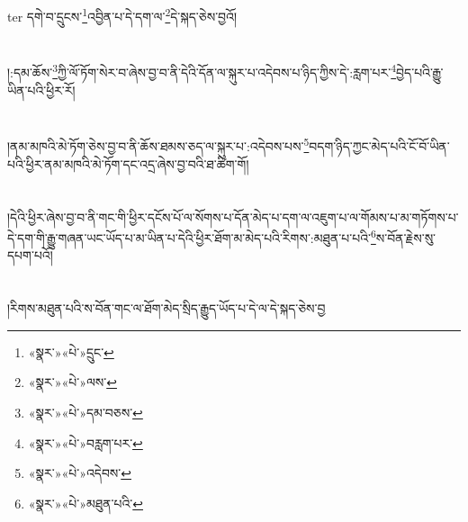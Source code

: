 ter{ }དགེ་བ་དྲུངས་\footnote{«སྣར་»«པེ་»དྲུང་}འབྱིན་པ་དེ་དག་ལ་\footnote{«སྣར་»«པེ་»ལས་}དེ་སྐད་ཅེས་བྱའོ།\chapter{ }།:དམ་ཆོས་\footnote{«སྣར་»«པེ་»དམ་བཅས་}ཀྱི་ལོ་ཏོག་སེར་བ་ཞེས་བྱ་བ་ནི་དེའི་དོན་ལ་སྐུར་པ་འདེབས་པ་ཉིད་ཀྱིས་དེ་:རླག་པར་\footnote{«སྣར་»«པེ་»བརླག་པར་}བྱེད་པའི་རྒྱུ་ཡིན་པའི་ཕྱིར་རོ།\chapter{ }།ནམ་མཁའི་མེ་ཏོག་ཅེས་བྱ་བ་ནི་ཆོས་ཐམས་ཅད་ལ་སྐུར་པ་:འདེབས་པས་\footnote{«སྣར་»«པེ་»འདེབས་}བདག་ཉིད་ཀྱང་མེད་པའི་ངོ་བོ་ཡིན་པའི་ཕྱིར་ནམ་མཁའི་མེ་ཏོག་དང་འདྲ་ཞེས་བྱ་བའི་ཐ་ཚིག་གོ།\chapter{ }།དེའི་ཕྱིར་ཞེས་བྱ་བ་ནི་གང་གི་ཕྱིར་དངོས་པོ་ལ་སོགས་པ་དོན་མེད་པ་དག་ལ་འཇུག་པ་ལ་གོམས་པ་མ་གཏོགས་པ་དེ་དག་གི་རྒྱུ་གཞན་ཡང་ཡོད་པ་མ་ཡིན་པ་དེའི་ཕྱིར་ཐོག་མ་མེད་པའི་རིགས་:མཐུན་པ་པའི་\footnote{«སྣར་»«པེ་»མཐུན་པའི་}ས་བོན་རྗེས་སུ་དཔག་པའོ།\chapter{ }།རིགས་མཐུན་པའི་ས་བོན་གང་ལ་ཐོག་མེད་སྲིད་རྒྱུད་ཡོད་པ་དེ་ལ་དེ་སྐད་ཅེས་བྱ